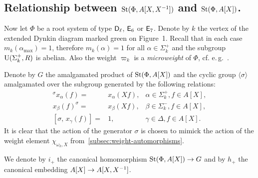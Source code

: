 \subsection{Relationship between $\operatorname{St}(\Phi, A[X, X^{-1}])$ and $\operatorname{St}(\Phi, A[X])$.} \label{subsec:short-presentation}
Now let $\Phi$ be a root system of type $\mathsf{D}_\ell$, $\mathsf{E}_6$ or $\mathsf{E}_7$.
Denote by $k$ the vertex of the extended Dynkin diagram marked green on Figure~1.
Recall that in each case $m_k(\alpha_\mathrm{\max}) = 1$, therefore $m_k(\alpha) = 1$ for all $\alpha \in \Sigma_k^+$ and the subgroup $\operatorname{U}(\Sigma^+_k, R)$ is abelian.
Also the weight $\varpi_k$ is a \textit{microweight} of $\Phi$, cf. e.\,g.~\cite[\S~2]{Ge17}.

Denote by $G$ the amalgamated product of $\operatorname{St}(\Phi, A[X])$ and the cyclic group $\langle \sigma \rangle$ amalgamated over the subgroup generated by the following relations:
\begin{align}
    {}^\sigma x_{\alpha}(f) = & x_{\alpha} (Xf), & \alpha \in \Sigma^+_k, f \in A[X], \label{eq:sigma-sigma-plus} \\
    x_{\beta}(f)^ \sigma     =& x_{\beta} (Xf), & \beta \in \Sigma^-_k, f \in A[X], \label{eq:sigma-sigma-minus} \\
    [\sigma,\, x_\gamma(f)]   =& 1, & \gamma \in \Delta, f \in A[X]. \label{eq:sigma-delta}
\end{align}
It is clear that the action of the generator $\sigma$ is chosen to mimick the action of the weight element $\chi_{\omega_k, X}$ from~\cref{subsec:weight-automorphisms}.

We denote by $i_+$ the canonical homomorphism $\operatorname{St}(\Phi, A[X]) \to G$ and by $h_+$ the canonical embedding $A[X] \to A[X, X^{-1}]$.

